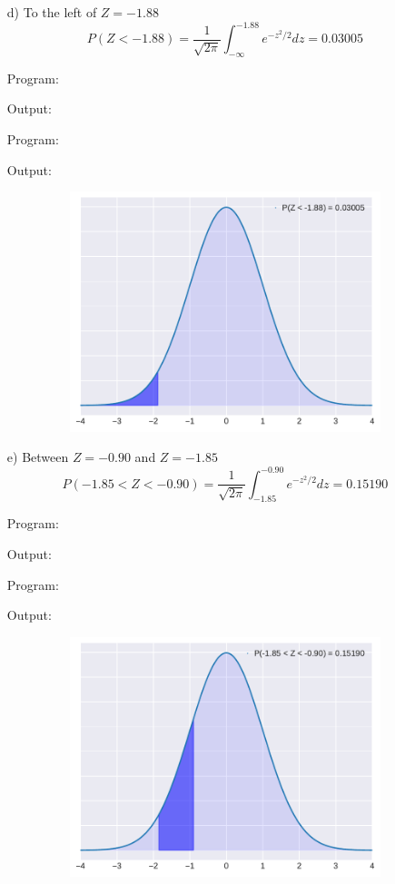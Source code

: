 \documentclass[a4paper,11pt,openright]{report}
\begin{document}
\begin{enumerate}
\begin{enumerate}
\pagebreak

\item[d)] To the left of $Z = -1.88$
\begin{equation*}
P(Z < -1.88) = \frac{1}{\sqrt{2\pi}} \int_{-\infty}^{-1.88} e^{-z^{2}/2} dz = 0.03005
\end{equation*}

Program:

Output:


Program:

Output:


\begin{figure}[ht!]
\includegraphics[width=14cm,height=7cm,keepaspectratio]{norm1d.pdf}
\centering
\end{figure}

\pagebreak

\item[e)] Between $Z = -0.90$ and $Z = -1.85$
\begin{equation*}
P(-1.85 < Z < -0.90) = \frac{1}{\sqrt{2\pi}} \int_{-1.85}^{-0.90} e^{-z^{2}/2} dz = 0.15190 
\end{equation*}

Program:

Output:


Program:

Output:


\begin{figure}[ht!]
\includegraphics[width=14cm,height=7cm,keepaspectratio]{norm1e.pdf}
\centering
\end{figure}


\end{enumerate}
\end{enumerate}
\end{document}
